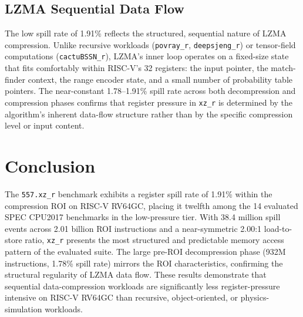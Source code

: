 \documentclass[conference]{IEEEtran}
\begin{document}
\subsection{LZMA Sequential Data Flow}

The low spill rate of 1.91\% reflects the structured, sequential
nature of LZMA compression. Unlike recursive workloads
(\texttt{povray\_r}, \texttt{deepsjeng\_r}) or tensor-field
computations (\texttt{cactuBSSN\_r}), LZMA's inner loop operates on
a fixed-size state that fits comfortably within RISC-V's 32 registers:
the input pointer, the match-finder context, the range encoder state,
and a small number of probability table pointers. The near-constant
1.78--1.91\% spill rate across both decompression and compression
phases confirms that register pressure in \texttt{xz\_r} is
determined by the algorithm's inherent data-flow structure rather
than by the specific compression level or input content.

\section{Conclusion}

The \texttt{557.xz\_r} benchmark exhibits a register spill rate of
1.91\% within the compression ROI on RISC-V RV64GC, placing it
twelfth among the 14 evaluated SPEC CPU2017 benchmarks in the
low-pressure tier. With 38.4 million spill events across 2.01 billion
ROI instructions and a near-symmetric 2.00:1 load-to-store ratio,
\texttt{xz\_r} presents the most structured and predictable memory
access pattern of the evaluated suite. The large pre-ROI
decompression phase (932M instructions, 1.78\% spill rate) mirrors
the ROI characteristics, confirming the structural regularity of
LZMA data flow. These results demonstrate that sequential
data-compression workloads are significantly less register-pressure
intensive on RISC-V RV64GC than recursive, object-oriented, or
physics-simulation workloads.
\end{document}
